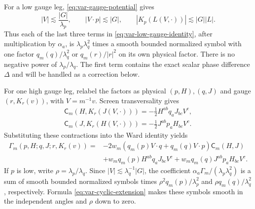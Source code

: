 \documentclass[11pt,a4paper]{article}
\numberwithin{equation}{section}
\newcommand{\f}[2]{\frac{#1}{#2}}
\newcommand{\ls}{\lesssim}
\theoremstyle{definition}
\begin{document}
For a low gauge leg, \eqref{eq:var-gauge-potential} gives
\begin{equation*}
|V|\ls\f{|G|}{\lambda_p},\qquad
|V\cdot p|\ls |G|,\qquad
|K_p(L(V,\cdot))|\ls |G||L|.
\end{equation*}
Thus each of the last three terms in \eqref{eq:var-low-gauge-identity},
after multiplication by $\alpha_a$, is
$\lambda_p\lambda_q^2$ times a smooth bounded normalized symbol with one factor
$q_m(q)/\lambda_q^2$ or $q_m(r)/|r|^2$ on its own physical factor.
There is no negative power of $\lambda_p/\lambda_q$.
The first term contains the exact scalar phase difference $\Delta$
and will be handled as a correction below.

For one high gauge leg, relabel the factors as physical $(p,H),(q,J)$
and gauge $(r,K_r(v))$, with $V=m^{-1}v$. Screen transversality gives
\begin{equation*}
\begin{gathered}
\mathsf C_m(H,K_r(J(V,\cdot)))
=-\f12H^{ab}q_aJ_{bc}V^c,\\
\mathsf C_m(J,K_r(H(V,\cdot)))
=-\f12J^{ab}p_aH_{bc}V^c.
\end{gathered}
\end{equation*}
Substituting these contractions into the Ward identity yields
\begin{equation*}
\begin{split}
\Gamma_m(p,H;q,J;r,K_r(v))
={}&-2w_m(q_m(p)V\cdot q+q_m(q)V\cdot p)\mathsf C_m(H,J)\\
&+w_mq_m(p)H^{ab}q_aJ_{bc}V^c
 +w_mq_m(q)J^{ab}p_aH_{bc}V^c.
\end{split}
\end{equation*}
If $p$ is low, write $\rho=\lambda_p/\lambda_q$. Since $|V|\ls \lambda_q^{-1}|G|$,
the coefficient $\alpha_a\Gamma_m/(\lambda_p\lambda_q^2)$ is a sum of smooth
bounded normalized symbols times $\rho^2q_m(p)/\lambda_p^2$ and
$\rho q_m(q)/\lambda_q^2$, respectively. Formula
\eqref{eq:var-cyclic-extension} makes these symbols smooth in the
independent angles and $\rho$ down to zero.
\end{document}
